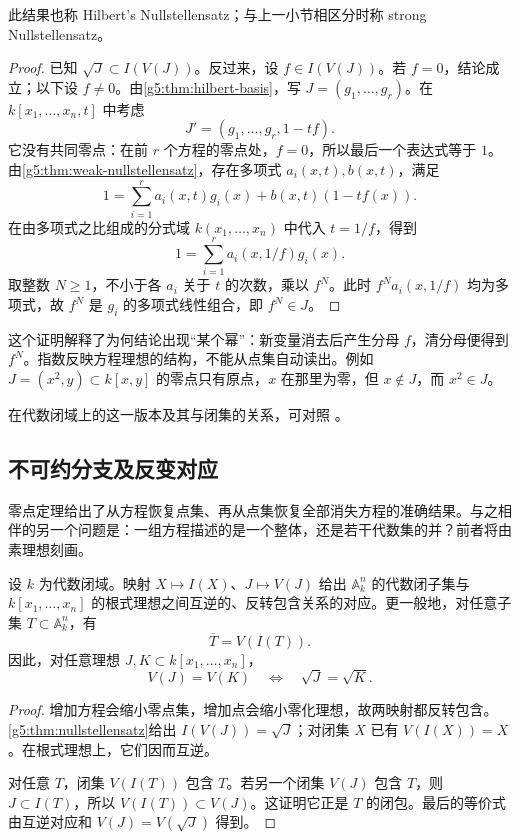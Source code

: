 此结果也称 Hilbert's Nullstellensatz；与上一小节相区分时称 strong Nullstellensatz。
\begin{proof}
	已知 \(\sqrt J\subset I(V(J))\)。反过来，设 \(f\in I(V(J))\)。若 \(f=0\)，结论成立；以下设 \(f\ne0\)。由\cref{g5:thm:hilbert-basis}，写 \(J=(g_1,\ldots,g_r)\)。在 \(k[x_1,\ldots,x_n,t]\) 中考虑
	\[
		J'=(g_1,\ldots,g_r,1-tf).
	\]
	它没有共同零点：在前 \(r\) 个方程的零点处，\(f=0\)，所以最后一个表达式等于 \(1\)。由\cref{g5:thm:weak-nullstellensatz}，存在多项式 \(a_i(x,t),b(x,t)\)，满足
	\[
		1=\sum_{i=1}^r a_i(x,t)g_i(x)+b(x,t)(1-tf(x)).
	\]
	在由多项式之比组成的分式域 \(k(x_1,\ldots,x_n)\) 中代入 \(t=1/f\)，得到
	\[
		1=\sum_{i=1}^r a_i(x,1/f)g_i(x).
	\]
	取整数 \(N\geq1\)，不小于各 \(a_i\) 关于 \(t\) 的次数，乘以 \(f^N\)。此时 \(f^Na_i(x,1/f)\) 均为多项式，故 \(f^N\) 是 \(g_i\) 的多项式线性组合，即 \(f^N\in J\)。
\end{proof}

这个证明解释了为何结论出现“某个幂”：新变量消去后产生分母 \(f\)，清分母便得到 \(f^N\)。指数反映方程理想的结构，不能从点集自动读出。例如 \(J=(x^2,y)\subset k[x,y]\) 的零点只有原点，\(x\) 在那里为零，但 \(x\notin J\)，而 \(x^2\in J\)。

在代数闭域上的这一版本及其与闭集的关系，可对照 \cite[第I章第1节，定理1.3A及推论1.4]{Hartshorne1977}。

\subsection{不可约分支及反变对应}
\label{g5:subsec:0101:05}

零点定理给出了从方程恢复点集、再从点集恢复全部消失方程的准确结果。与之相伴的另一个问题是：一组方程描述的是一个整体，还是若干代数集的并？前者将由素理想刻画。

\begin{theorem}\label{g5:thm:affine-closed-correspondence}
	设 \(k\) 为代数闭域。映射 \(X\mapsto I(X)\)、\(J\mapsto V(J)\) 给出 \(\mathbb A_k^n\) 的代数闭子集与 \(k[x_1,\ldots,x_n]\) 的根式理想之间互逆的、反转包含关系的对应。更一般地，对任意子集 \(T\subset\mathbb A_k^n\)，有
	\[
		\overline T=V(I(T)).
	\]
	因此，对任意理想 \(J,K\subset k[x_1,\ldots,x_n]\)，
	\[
		V(J)=V(K)\quad\Longleftrightarrow\quad\sqrt J=\sqrt K.
	\]
\end{theorem}
\begin{proof}
	增加方程会缩小零点集，增加点会缩小零化理想，故两映射都反转包含。\cref{g5:thm:nullstellensatz}给出 \(I(V(J))=\sqrt J\)；对闭集 \(X\) 已有 \(V(I(X))=X\)。在根式理想上，它们因而互逆。

	对任意 \(T\)，闭集 \(V(I(T))\) 包含 \(T\)。若另一个闭集 \(V(J)\) 包含 \(T\)，则 \(J\subset I(T)\)，所以 \(V(I(T))\subset V(J)\)。这证明它正是 \(T\) 的闭包。最后的等价式由互逆对应和 \(V(J)=V(\sqrt J)\) 得到。
\end{proof}

